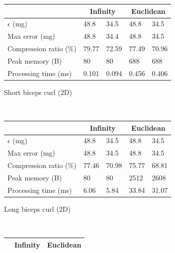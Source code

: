 \documentclass[10pt, conference, compsocconf]{IEEEtran}
\begin{document}
\begin{table}
    \begin{subfigure}{\columnwidth}
    \centering
    \begin{tabular}{l|l|l|l|l}
    \hline
    \rowcolor{headcolor}
                           & \multicolumn{2}{c|}{Infinity} & \multicolumn{2}{c}{Euclidean}\\ \hline
    $\epsilon$  (mg)          & 48.8         & 34.5       & 48.8       & 34.5 \\
    Max error   (mg)          & 48.8         & 34.4       & 48.8       & 34.5 \\
    Compression ratio (\%)    & 79.77        & 72.59      & 77.49      & 70.96\\
    Peak memory   (B)         & 80           & 80         & 688        & 688  \\
    Processing time (ms)      & 0.101        & 0.094      & 0.456      & 0.406\\ \hline
    \end{tabular}
    \caption{Short biceps curl (2D)}
    \end{subfigure}\\
    \begin{subfigure}{\columnwidth}
    \centering
    \begin{tabular}{l|l|l|l|l}
    \hline
    \rowcolor{headcolor}
                   & \multicolumn{2}{c|}{Infinity} & \multicolumn{2}{c}{Euclidean} \\ \hline
    $\epsilon$ (mg)            & 48.8        & 34.5       & 48.8        & 34.5    \\
    Max error  (mg)            & 48.8        & 34.5       & 48.8        & 34.5             \\
    Compression ratio (\%)     & 77.46       & 70.98      & 75.77       & 68.81           \\
    Peak memory  (B)           & 80          & 80         & 2512        & 2608             \\
    Processing time (ms)       & 6.06        & 5.84       & 33.84       & 31.07           \\ \hline
    \end{tabular}
    \caption{Long biceps curl (2D)}
    \end{subfigure}\\
    \begin{subfigure}{\columnwidth}
    \centering
    \begin{tabular}{l|l|l|l|l}
    \hline
    \rowcolor{headcolor}
                           & \multicolumn{2}{c|}{Infinity} & \multicolumn{2}{c}{Euclidean} \\ \hline

\end{tabular}
\end{subfigure}
\end{table}
\end{document}
